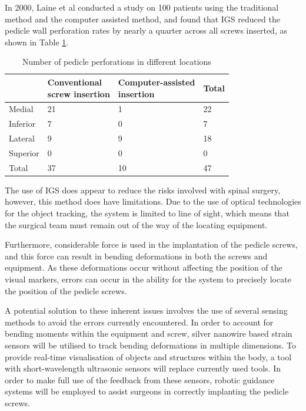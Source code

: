 \documentclass[conference, a4paper]{IEEEtran}
\begin{document}
In 2000, Laine et al conducted a study on 100 patients using the traditional method and the 
computer assisted method, and found that IGS reduced the pedicle wall perforation rates by 
nearly a quarter across all screws inserted, as shown in Table \ref{tab:accuracy}\cite{Laine2000}.
\begin{table}[h!]
	\centering
	\begin{tabular}{l l l l }
		& \shortstack{Conventional\\screw insertion} & \shortstack{Computer-assisted\\insertion} & Total \\ \hline
		Medial & 21 & 1 & 22 \\ \hline
		Inferior & 7 & 0 & 7 \\ \hline
		Lateral & 9 & 9 & 18 \\ \hline
		Superior & 0 & 0 & 0 \\ \hline
		Total & 37 &10 & 47 \\
	\end{tabular}
	\caption{Number of pedicle perforations in different locations\cite{Laine2000}}
	\label{tab:accuracy}
\end{table}

The use of IGS does appear to reduce the risks involved with spinal surgery, 
however, this method does have limitations. Due to the use of optical technologies for the object tracking, the
system is limited to line of sight, which means that the surgical team must remain out of the way of the locating
equipment. 

Furthermore, considerable force is used in the implantation of the pedicle screws, and this force can
result in bending deformations in both the screws and equipment\cite{Chatzistergos2010}. As these deformations occur without
affecting the position of the visual markers, errors can occur in the ability for the system to precisely locate the
position of the pedicle screws\cite{Castro1996}\cite{DiGioia1998}.


A potential solution to these inherent issues involves the use of several sensing methods to avoid the errors
currently encountered. In order to account for bending moments within the equipment and screw, silver
nanowire based strain sensors will be utilised to track bending deformations in multiple dimensions. To provide
real-time visualisation of objects and structures within the body, a tool with short-wavelength ultrasonic sensors will
replace currently used tools. In order to make full use of the feedback from these sensors, robotic guidance
systems will be employed to assist surgeons in correctly implanting the pedicle screws. 
\end{document}
